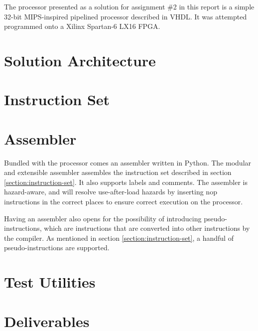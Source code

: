 The processor presented as a solution for assignment \#2 in this report is a simple 32-bit MIPS-inspired pipelined processor described in VHDL.
It was attempted programmed onto a Xilinx Spartan-6 LX16 FPGA.

\section{Solution Architecture}



\newpage
\section{Instruction Set}
\label{section:instruction-set}

 \label{sec:instruction-set}

\section{Assembler}

Bundled with the processor comes an assembler written in Python.
The modular and extensible assembler assembles the instruction set described in section \vref{section:instruction-set}.
It also supports labels and comments.
The assembler is hazard-aware, and will resolve use-after-load hazards by inserting nop instructions in the correct places to ensure correct execution on the processor.

Having an assembler also opens for the possibility of introducing pseudo-instructions, which are instructions that are converted into other instructions by the compiler.
As mentioned in section \vref{section:instruction-set}, a handful of pseudo-instructions are supported.

\section{Test Utilities}



\section{Deliverables}


